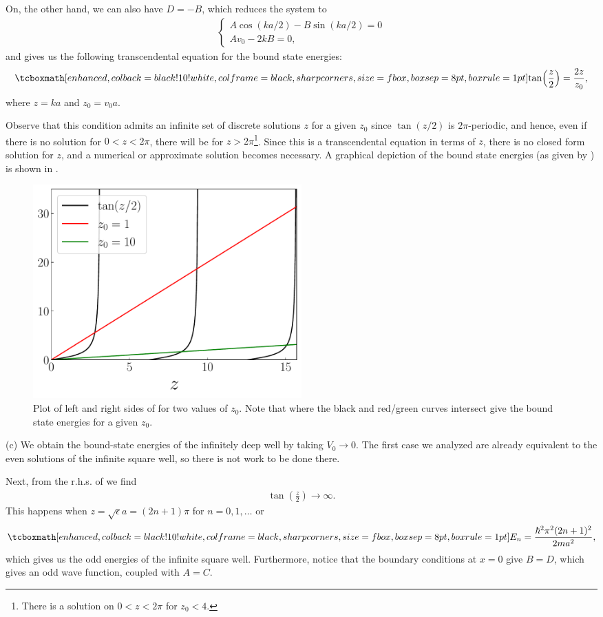 {On, the other hand, we can also have $D = -B$, which reduces the system to
\begin{eqnarray}
\label{eq:odd-bs-sys}
\begin{cases}
    A \cos(k a /2) - B \sin(k a/2) = 0 \\
    A v_0 - 2kB = 0
,\end{cases}
\end{eqnarray}
and gives us the following transcendental equation for the bound state energies: 
\begin{eqnarray}
    \label{eq:bound-state-cond}
    \eqbox{ \tan(\frac{z}{2}) = \frac{2z}{z_0} }
,\end{eqnarray}
where $z = ka$ and $z_0 = v_0 a$.

Observe that this condition admits an infinite set of discrete solutions $z$ for a given $z_0$ since $\tan(z/2)$ is $2\pi$-periodic, and hence, even if there is no solution for $0 < z < 2 \pi$, there will be for $z > 2\pi$\footnote{There is a solution on $0 < z < 2\pi$ for $z_0 < 4$.}.
Since this is a transcendental equation in terms of $z$, there is no closed form solution for $z$, and a numerical or approximate solution becomes necessary.
A graphical depiction of the bound state energies (as given by ) is shown in .

\begin{figure}[h!]
    \centering
    \includegraphics[width=0.5\textwidth]{prob1b.pdf}
    \caption{Plot of left and right sides of  for two values of $z_0$. Note that where the black and red/green curves intersect give the bound state energies for a given $z_0$.}
    \label{fig:prob1b}
\end{figure}

(c) We obtain the bound-state energies of the infinitely deep well by taking $V_0 \rightarrow 0$.
The first case we analyzed are already equivalent to the even solutions of the infinite square well, so there is not work to be done there.

Next, from the r.h.s. of  we find
\begin{eqnarray}
    \tan(\frac{z}{2}) \rightarrow \infty
.\end{eqnarray}
This happens when $z = \sqrt{\epsilon} a = (2n +1) \pi$ for $n = 0,1,\ldots$ or
\begin{eqnarray}
    \eqbox{ E_{n} = \frac{\hbar^2 \pi^2 (2n+1)^2 }{2 m a^2} }
,\end{eqnarray}
which gives us the odd energies of the infinite square well.
Furthermore, notice that the boundary conditions at $x = 0$ give $B = D$, which gives an odd wave function, coupled with $A = C$.


}


